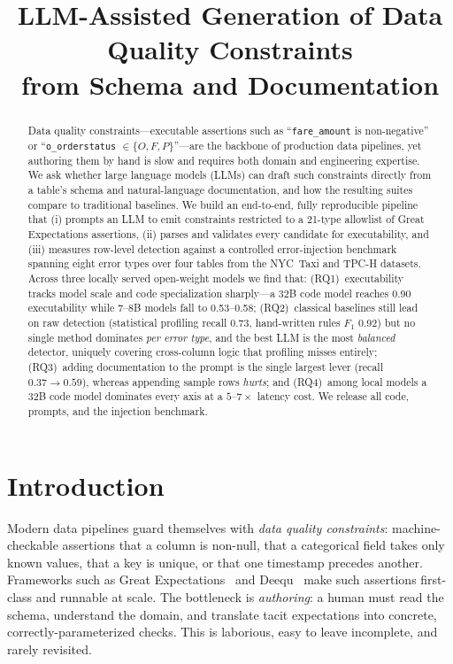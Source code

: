 \documentclass[10pt,twocolumn]{article}
\title{\vspace{-2em}\textbf{LLM-Assisted Generation of Data Quality Constraints\\
from Schema and Documentation}}
\author{}
\date{}
\begin{document}
\maketitle

\begin{abstract}
Data quality constraints---executable assertions such as ``\texttt{fare\_amount}
is non-negative'' or ``\texttt{o\_orderstatus} $\in \{O,F,P\}$''---are the
backbone of production data pipelines, yet authoring them by hand is slow and
requires both domain and engineering expertise. We ask whether large language
models (LLMs) can draft such constraints directly from a table's schema and
natural-language documentation, and how the resulting suites compare to
traditional baselines. We build an end-to-end, fully reproducible pipeline that
(i) prompts an LLM to emit constraints restricted to a 21-type allowlist of
Great Expectations assertions, (ii) parses and validates every candidate for
executability, and (iii) measures row-level detection against a controlled
error-injection benchmark spanning eight error types over four tables from the
NYC~Taxi and TPC-H datasets. Across three locally served open-weight models we
find that: (RQ1)~executability tracks model scale and code specialization
sharply---a 32B code model reaches 0.90 executability while 7--8B models fall to
0.53--0.58; (RQ2)~classical baselines still lead on raw detection (statistical
profiling recall 0.73, hand-written rules $F_1$ 0.92) but no single method
dominates \emph{per error type}, and the best LLM is the most \emph{balanced}
detector, uniquely covering cross-column logic that profiling misses entirely;
(RQ3)~adding documentation to the prompt is the single largest lever (recall
$0.37\!\to\!0.59$), whereas appending sample rows \emph{hurts}; and (RQ4)~among
local models a 32B code model dominates every axis at a $5$--$7\times$ latency
cost. We release all code, prompts, and the injection benchmark.
\end{abstract}

\section{Introduction}
Modern data pipelines guard themselves with \emph{data quality constraints}:
machine-checkable assertions that a column is non-null, that a categorical field
takes only known values, that a key is unique, or that one timestamp precedes
another. Frameworks such as Great Expectations~\cite{greatexpectations} and
Deequ~\cite{amazondeequ} make such assertions first-class and runnable at scale.
The bottleneck is \emph{authoring}: a human must read the schema, understand the
domain, and translate tacit expectations into concrete, correctly-parameterized
checks. This is laborious, easy to leave incomplete, and rarely revisited.
\end{document}
